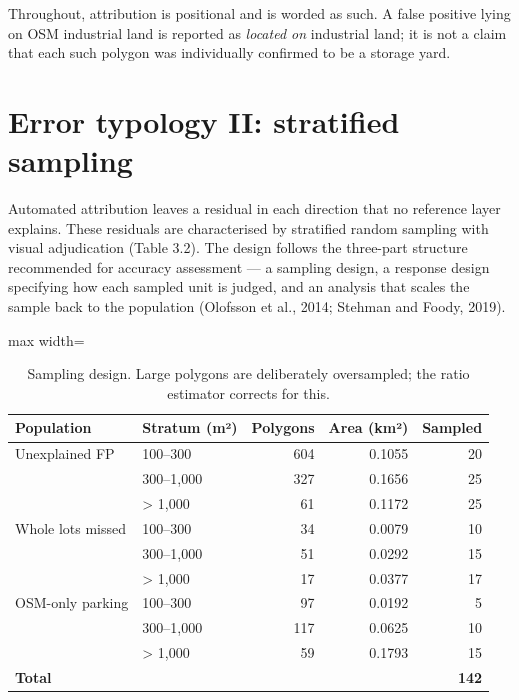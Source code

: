 Throughout, attribution is positional and is worded as such. A false positive lying on OSM industrial land is reported as \emph{located on} industrial land; it is not a claim that each such polygon was individually confirmed to be a storage yard.

\hypertarget{error-typology-ii-stratified-sampling}{%
\section{Error typology II: stratified sampling}\label{error-typology-ii-stratified-sampling}}

Automated attribution leaves a residual in each direction that no reference layer explains. These residuals are characterised by stratified random sampling with visual adjudication (Table 3.2). The design follows the three-part structure recommended for accuracy assessment --- a sampling design, a response design specifying how each sampled unit is judged, and an analysis that scales the sample back to the population (Olofsson et al., 2014; Stehman and Foody, 2019).

\begin{table}[htbp]
\centering
\caption{Sampling design. Large polygons are deliberately oversampled; the ratio estimator corrects for this.}\label{tab:3.2}
\begin{adjustbox}{max width=\textwidth}
\begin{tabular}{@{}llrrr@{}}
\toprule
Population & Stratum (m²) & Polygons & Area (km²) & Sampled \\
\midrule
Unexplained FP & 100--300 & 604 & 0.1055 & 20 \\
& 300--1,000 & 327 & 0.1656 & 25 \\
& \textgreater{} 1,000 & 61 & 0.1172 & 25 \\
Whole lots missed & 100--300 & 34 & 0.0079 & 10 \\
& 300--1,000 & 51 & 0.0292 & 15 \\
& \textgreater{} 1,000 & 17 & 0.0377 & 17 \\
OSM-only parking & 100--300 & 97 & 0.0192 & 5 \\
& 300--1,000 & 117 & 0.0625 & 10 \\
& \textgreater{} 1,000 & 59 & 0.1793 & 15 \\
\textbf{Total} & & & & \textbf{142} \\
\bottomrule
\end{tabular}
\end{adjustbox}
\end{table}
\restoreparskip

